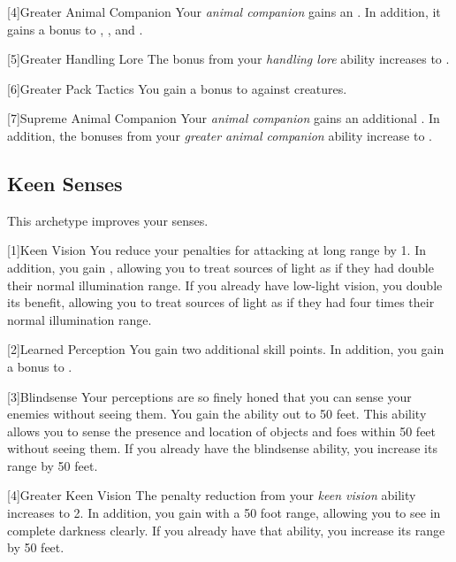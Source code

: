         [4]{Greater Animal Companion} Your \textit{animal companion} gains an .
        In addition, it gains a  bonus to , , and .

        [5]{Greater Handling Lore} The bonus from your \textit{handling lore} ability increases to .

        [6]{Greater Pack Tactics} You gain a  bonus to  against  creatures.

        [7]{Supreme Animal Companion} Your \textit{animal companion} gains an additional .
        In addition, the bonuses from your \textit{greater animal companion} ability increase to .

    \subsection{Keen Senses}
        This archetype improves your senses.

        [1]{Keen Vision}
        You reduce your  penalties for attacking at long range by 1.
        In addition, you gain , allowing you to treat sources of light as if they had double their normal illumination range.
        If you already have low-light vision, you double its benefit, allowing you to treat sources of light as if they had four times their normal illumination range.

        [2]{Learned Perception} You gain two additional skill points.
        In addition, you gain a  bonus to .

        [3]{Blindsense}
        Your perceptions are so finely honed that you can sense your enemies without seeing them.
        You gain the  ability out to 50 feet.
        This ability allows you to sense the presence and location of objects and foes within 50 feet without seeing them.
        If you already have the blindsense ability, you increase its range by 50 feet.

        [4]{Greater Keen Vision} The penalty reduction from your \textit{keen vision} ability increases to 2.
        In addition, you gain  with a 50 foot range, allowing you to see in complete darkness clearly.
        If you already have that ability, you increase its range by 50 feet.

